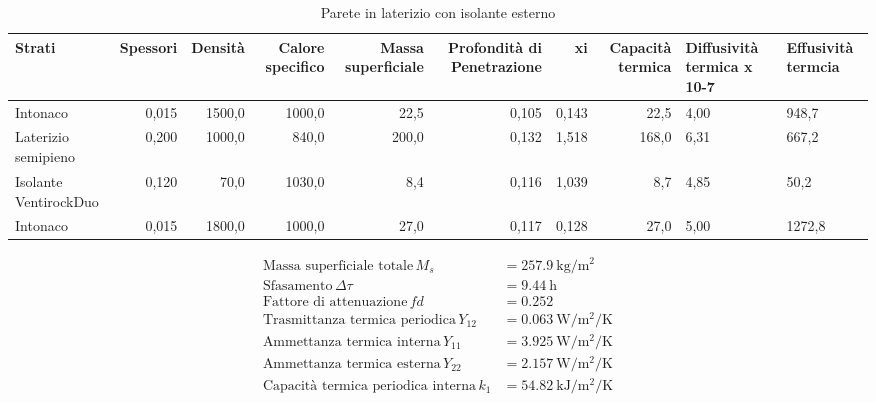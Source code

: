 \begin{table}
\centering
\caption{Parete in laterizio con isolante esterno}
\begin{tabular}{lrrrrrrr}
\toprule
                Strati & Spessori & Densità & Calore specifico & Massa superficiale & Profondità di Penetrazione &     xi & Capacità termica & Diffusività termica x 10-7 & Effusività termcia \\
\midrule
              Intonaco &    0,015 &  1500,0 &           1000,0 &               22,5 &                      0,105 &  0,143 &             22,5 &                       4,00 &              948,7 \\
   Laterizio semipieno &    0,200 &  1000,0 &            840,0 &              200,0 &                      0,132 &  1,518 &            168,0 &                       6,31 &              667,2 \\
 Isolante VentirockDuo &    0,120 &    70,0 &           1030,0 &                8,4 &                      0,116 &  1,039 &              8,7 &                       4,85 &               50,2 \\
              Intonaco &    0,015 &  1800,0 &           1000,0 &               27,0 &                      0,117 &  0,128 &             27,0 &                       5,00 &             1272,8 \\
\bottomrule
\end{tabular}
\end{table}

\begin{flushleft}
\begin{align*}
\text{Massa superficiale totale} \, M_s &= \SI{257.9}{\kilo\gram\per\metre\squared}\\
\text{Sfasamento} \, \Delta\tau &= \SI{9.44}{\hour}\\
\text{Fattore di attenuazione} \, fd &= \SI{0.252}{}\\
\text{Trasmittanza termica periodica} \, Y_{12} &= \SI{0.063}{\watt\per\metre\squared\per\kelvin}\\
\text{Ammettanza termica interna} \, Y_{11} &= \SI{3.925}{\watt\per\metre\squared\per\kelvin}\\
\text{Ammettanza termica esterna} \, Y_{22} &= \SI{2.157}{\watt\per\metre\squared\per\kelvin}\\
\text{Capacità termica periodica interna} \, k_1 &= \SI{54.82}{\kilo\joule\per\metre\squared\per\kelvin}\\
\end{align*}
\end{flushleft}
